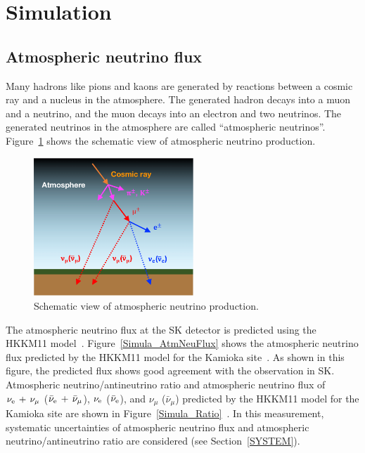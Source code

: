 
%
%

\section{Simulation}\label{Section_Simula}





\subsection{Atmospheric neutrino flux}
\vs\hs
Many hadrons like pions and kaons are generated by reactions between a cosmic ray and a nucleus in the atmosphere.
The generated hadron decays into a muon and a neutrino, and the muon decays into an electron and two neutrinos.
The generated neutrinos in the atmosphere are called ``atmospheric neutrinos''.
Figure~\ref{Simula_AtmNeu} shows the schematic view of atmospheric neutrino production.

\begin{figure}[h]
	\centering
	\includegraphics[width=6cm]{Figures/Simulation/AtmNeu}
	\caption[Schematic view of atmospheric neutrino production]{
	Schematic view of atmospheric neutrino production.
	}\label{Simula_AtmNeu}
\end{figure}

\hs
The atmospheric neutrino flux at the SK detector is predicted using the HKKM11 model~\cite{2011Honda}.
Figure~\ref{Simula_AtmNeuFlux} shows the atmospheric neutrino flux predicted by the HKKM11 model for the Kamioka site~\cite{2011Honda,2016Richard}.
As shown in this figure, the predicted flux shows good agreement with the observation in SK.
Atmospheric neutrino/antineutrino ratio and atmospheric neutrino flux of $\nu_{\rm e}\,+\,\nu_{\mu}$ ($\bar{\nu}_{\rm e}\,+\,\bar{\nu}_{\mu}$), $\nu_{\rm e}$ ($\bar{\nu}_{\rm e}$), and $\nu_{\mu}$ ($\bar{\nu}_{\mu}$) predicted by the HKKM11 model for the Kamioka site are shown in Figure~\ref{Simula_Ratio}~\cite{2011Honda}.
In this measurement, systematic uncertainties of atmospheric neutrino flux and atmospheric neutrino/antineutrino ratio are considered (see Section~\ref{SYSTEM}).

